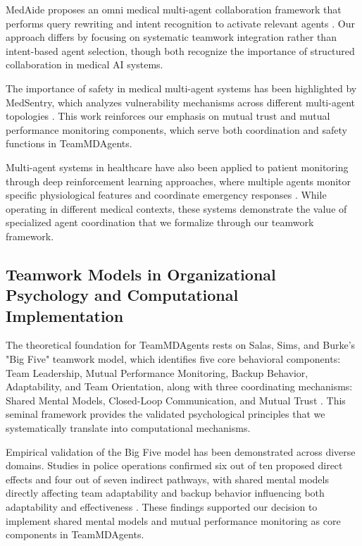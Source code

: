 \documentclass[letterpaper]{article} %
\begin{document}
MedAide proposes an omni medical multi-agent collaboration framework that performs query rewriting and intent recognition to activate relevant agents \cite{wang2024medaide}. Our approach differs by focusing on systematic teamwork integration rather than intent-based agent selection, though both recognize the importance of structured collaboration in medical AI systems.

The importance of safety in medical multi-agent systems has been highlighted by MedSentry, which analyzes vulnerability mechanisms across different multi-agent topologies \cite{anonymous2025medsentry}. This work reinforces our emphasis on mutual trust and mutual performance monitoring components, which serve both coordination and safety functions in TeamMDAgents.

Multi-agent systems in healthcare have also been applied to patient monitoring through deep reinforcement learning approaches, where multiple agents monitor specific physiological features and coordinate emergency responses \cite{chen2023adaptive}. While operating in different medical contexts, these systems demonstrate the value of specialized agent coordination that we formalize through our teamwork framework.

\subsection{Teamwork Models in Organizational Psychology and Computational Implementation}

The theoretical foundation for TeamMDAgents rests on Salas, Sims, and Burke's "Big Five" teamwork model, which identifies five core behavioral components: Team Leadership, Mutual Performance Monitoring, Backup Behavior, Adaptability, and Team Orientation, along with three coordinating mechanisms: Shared Mental Models, Closed-Loop Communication, and Mutual Trust \cite{salas2005big}. This seminal framework provides the validated psychological principles that we systematically translate into computational mechanisms.

Empirical validation of the Big Five model has been demonstrated across diverse domains. Studies in police operations confirmed six out of ten proposed direct effects and four out of seven indirect pathways, with shared mental models directly affecting team adaptability and backup behavior influencing both adaptability and effectiveness \cite{verhage2022police}. These findings supported our decision to implement shared mental models and mutual performance monitoring as core components in TeamMDAgents.
\end{document}
